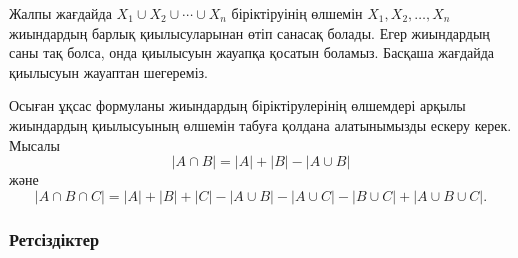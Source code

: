 
\begin{center}
\end{center}

Жалпы жағдайда $X_1 \cup X_2 \cup \cdots \cup X_n$ біріктіруінің 
өлшемін $X_1,X_2,\ldots,X_n$ жиындардың барлық қиылысуларынан өтіп санасақ болады. Егер жиындардың саны тақ болса, онда қиылысуын жауапқа қосатын 
боламыз. Басқаша жағдайда қиылысуын жауаптан шегереміз. 


Осыған ұқсас формуланы жиындардың 
біріктірулерінің өлшемдері арқылы жиындардың 
қиылысуының өлшемін табуға қолдана алатынымызды ескеру керек.
Мысалы
\[ |A \cap B| = |A| + |B| - |A \cup B|\]
және 
\[ |A \cap B \cap C| = |A| + |B| + |C| - |A \cup B|  - |A \cup C|  - |B \cup C| + |A \cup B \cup C| .\]


\subsubsection{Ретсіздіктер}

